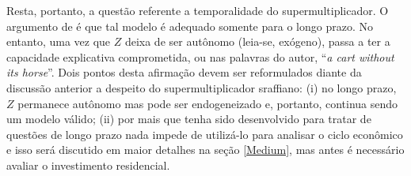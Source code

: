 Resta, portanto, a questão referente a temporalidade do supermultiplicador. O argumento de \citeauthor*{nikiforos_comments_2018} é que tal modelo é adequado somente para o longo prazo. No entanto, uma vez que $Z$ deixa de ser autônomo (leia-se, exógeno), passa a ter a capacidade explicativa comprometida, ou nas palavras do autor, ``\textit{a cart without its horse}''. 
Dois pontos desta afirmação devem ser reformulados diante da discussão anterior a despeito do supermultiplicador sraffiano: (i) no longo prazo, $Z$ permanece autônomo mas pode ser endogeneizado e, portanto, continua sendo um modelo válido; (ii) por mais que tenha sido desenvolvido para tratar de questões de longo prazo nada impede de utilizá-lo para analisar o ciclo econômico e isso será discutido em maior detalhes na seção \ref{Medium}, mas antes é necessário avaliar o investimento residencial.

